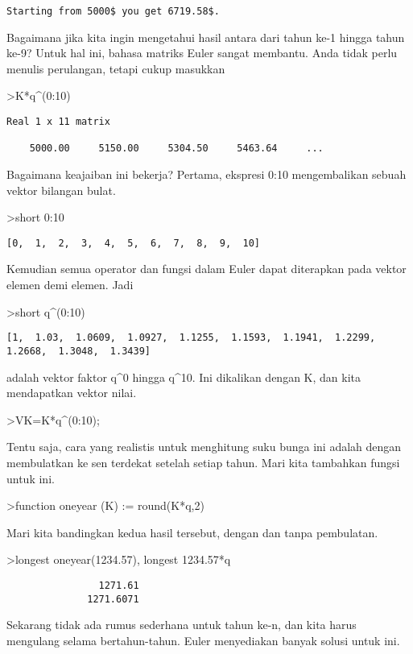\documentclass[
]{book}
\begin{document}
\begin{verbatim}
Starting from 5000$ you get 6719.58$.
\end{verbatim}

Bagaimana jika kita ingin mengetahui hasil antara dari tahun ke-1 hingga tahun ke-9? Untuk hal ini, bahasa matriks Euler sangat membantu. Anda tidak perlu menulis perulangan, tetapi cukup masukkan

\textgreater K*q\^{}(0:10)

\begin{verbatim}
Real 1 x 11 matrix

    5000.00     5150.00     5304.50     5463.64     ...
\end{verbatim}

Bagaimana keajaiban ini bekerja? Pertama, ekspresi 0:10 mengembalikan sebuah vektor bilangan bulat.

\textgreater short 0:10

\begin{verbatim}
[0,  1,  2,  3,  4,  5,  6,  7,  8,  9,  10]
\end{verbatim}

Kemudian semua operator dan fungsi dalam Euler dapat diterapkan pada vektor elemen demi elemen. Jadi

\textgreater short q\^{}(0:10)

\begin{verbatim}
[1,  1.03,  1.0609,  1.0927,  1.1255,  1.1593,  1.1941,  1.2299,
1.2668,  1.3048,  1.3439]
\end{verbatim}

adalah vektor faktor q\^{}0 hingga q\^{}10. Ini dikalikan dengan K, dan kita mendapatkan vektor nilai.

\textgreater VK=K*q\^{}(0:10);

Tentu saja, cara yang realistis untuk menghitung suku bunga ini adalah dengan membulatkan ke sen terdekat setelah setiap tahun. Mari kita tambahkan fungsi untuk ini.

\textgreater function oneyear (K) := round(K*q,2)

Mari kita bandingkan kedua hasil tersebut, dengan dan tanpa pembulatan.

\textgreater longest oneyear(1234.57), longest 1234.57*q

\begin{verbatim}
                1271.61 
              1271.6071 
\end{verbatim}

Sekarang tidak ada rumus sederhana untuk tahun ke-n, dan kita harus mengulang selama bertahun-tahun. Euler menyediakan banyak solusi untuk ini.
\end{document}
